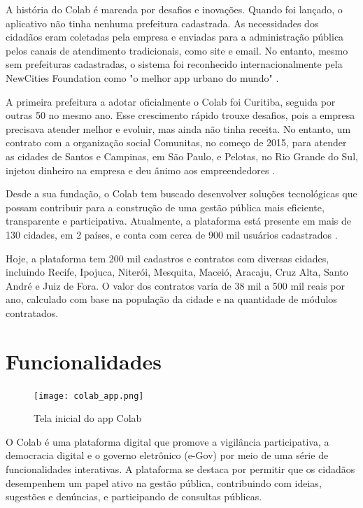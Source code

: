 A história do Colab é marcada por desafios e inovações. Quando foi lançado, o aplicativo não tinha nenhuma prefeitura cadastrada. As necessidades dos cidadãos eram coletadas pela empresa e enviadas para a administração pública pelos canais de atendimento tradicionais, como site e email. No entanto, mesmo sem prefeituras cadastradas, o sistema foi reconhecido internacionalmente pela NewCities Foundation como "o melhor app urbano do mundo" \cite{2023_Colab_PAGE}.

A primeira prefeitura a adotar oficialmente o Colab foi Curitiba, seguida por outras 50 no mesmo ano. Esse crescimento rápido trouxe desafios, pois a empresa precisava atender melhor e evoluir, mas ainda não tinha receita. No entanto, um contrato com a organização social Comunitas, no começo de 2015, para atender as cidades de Santos e Campinas, em São Paulo, e Pelotas, no Rio Grande do Sul, injetou dinheiro na empresa e deu ânimo aos empreendedores \cite{2023_Colab_PAGE}.

Desde a sua fundação, o Colab tem buscado desenvolver soluções tecnológicas que possam contribuir para a construção de uma gestão pública mais eficiente, transparente e participativa. Atualmente, a plataforma está presente em mais de 130 cidades, em 2 países, e conta com cerca de 900 mil usuários cadastrados \cite{2023_Colab_PAGE}.

Hoje, a plataforma tem 200 mil cadastros e contratos com diversas cidades, incluindo Recife, Ipojuca, Niterói, Mesquita, Maceió, Aracaju, Cruz Alta, Santo André e Juiz de Fora. O valor dos contratos varia de 38 mil a 500 mil reais por ano, calculado com base na população da cidade e na quantidade de módulos contratados.

\section*{Funcionalidades}

\begin{figure}[!htb]
	\caption{Tela inicial do app Colab}
	\label{fig:colab_app}
	\centering
	\texttt{[image: colab\_app.png]}
\end{figure}

O Colab é uma plataforma digital que promove a vigilância participativa, a democracia digital e o governo eletrônico (e-Gov) por meio de uma série de funcionalidades interativas. A plataforma se destaca por permitir que os cidadãos desempenhem um papel ativo na gestão pública, contribuindo com ideias, sugestões e denúncias, e participando de consultas públicas.

